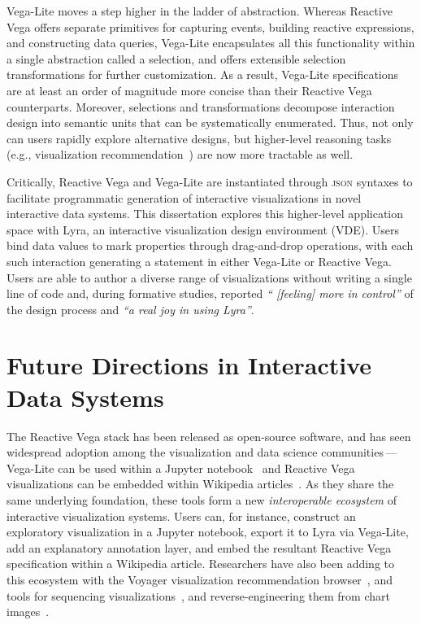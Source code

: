 Vega-Lite moves a step higher in the ladder of abstraction. Whereas Reactive
Vega offers separate primitives for capturing events, building reactive
expressions, and constructing data queries, Vega-Lite encapsulates all this
functionality within a single abstraction called a selection, and offers
extensible selection transformations for further customization. As a result,
Vega-Lite specifications are at least an order of magnitude more concise than
their Reactive Vega counterparts. Moreover, selections and transformations
decompose interaction design into semantic units that can be systematically
enumerated. Thus, not only can users rapidly explore alternative designs, but
higher-level reasoning tasks (e.g., visualization
recommendation~\cite{compassql}) are now more tractable as well.

Critically, Reactive Vega and Vega-Lite are instantiated through \textsc{json}
syntaxes to facilitate programmatic generation of interactive visualizations in
novel interactive data systems. This dissertation explores this higher-level
application space with Lyra, an interactive visualization design environment
(VDE). Users bind data values to mark properties through drag-and-drop
operations, with each such interaction generating a statement in either
Vega-Lite or Reactive Vega. Users are able to author a diverse range of
visualizations without writing a single line of code and, during formative
studies, reported \emph{`` [feeling] more in control''} of the design process
and \emph{``a real joy in using Lyra''}.

\vspace{-10pt}

\section{Future Directions in Interactive Data Systems}

\vspace{-10pt}

The Reactive Vega stack has been released as open-source software, and has seen
widespread adoption among the visualization and data science
communities\,---\,Vega-Lite can be used within a Jupyter
notebook~\cite{vega-lite:altair} and Reactive Vega visualizations can be
embedded within Wikipedia articles~\cite{mediawiki:graph}. As they share the
same underlying foundation, these tools form a new \emph{interoperable
ecosystem} of interactive visualization systems. Users can, for instance,
construct an exploratory visualization in a Jupyter notebook, export it to Lyra
via Vega-Lite, add an explanatory annotation layer, and embed the resultant
Reactive Vega specification within a Wikipedia article. Researchers have also
been adding to this ecosystem with the Voyager visualization recommendation
browser~\cite{voyager,voyager2,compassql}, and tools for sequencing
visualizations~\cite{kim:graphscape}, and reverse-engineering them from chart
images~\cite{poco:reverse}.

